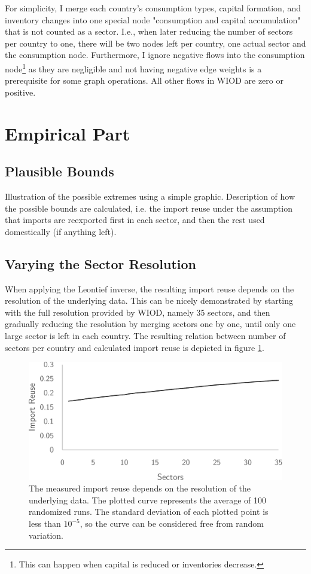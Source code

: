 \documentclass[english]{uzhpub}
\begin{document}
For simplicity, I merge each country's consumption types, capital formation, and inventory changes into one special node "consumption and capital accumulation" that is not counted as a sector. I.e., when later reducing the number of sectors per country to one, there will be two nodes left per country, one actual sector and the consumption node. Furthermore, I ignore negative flows into the consumption node\footnote{This can happen when capital is reduced or inventories decrease.} as they are negligible and not having negative edge weights is a prerequisite for some graph operations. All other flows in WIOD are zero or positive.

\section{Empirical Part}

\subsection{Plausible Bounds}
Illustration of the possible extremes using a simple graphic. Description of how the possible bounds are calculated, i.e. the import reuse under the assumption that imports are reexported first in each sector, and then the rest used domestically (if anything left).

\subsection{Varying the Sector Resolution}
When applying the Leontief inverse, the resulting import reuse depends on the resolution of the underlying data. This can be nicely demonstrated by starting with the full resolution provided by WIOD, namely 35 sectors, and then gradually reducing the resolution by merging sectors one by one, until only one large sector is left in each country. The resulting relation between number of sectors per country and calculated import reuse is depicted in figure \ref{fig:resolution}.

\begin{figure}
\centering
\includegraphics[scale=0.5]{../data/resolution}
\caption{The measured import reuse depends on the resolution of the underlying data. The plotted curve represents the average of 100 randomized runs. The standard deviation of each plotted point is less than $10^{-5}$, so the curve can be considered free from random variation.} \label{fig:resolution}
\end{figure}
\end{document}
